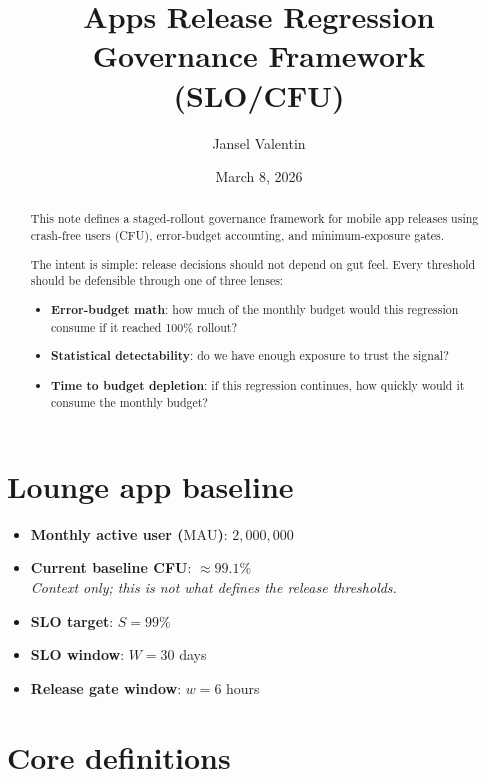 \documentclass{article}
\title{Apps Release Regression Governance Framework (SLO/CFU)}
\author{Jansel Valentin}
\date{March 8, 2026}
\newcommand{\MAU}{\mathrm{MAU}}
\begin{document}
\maketitle

\begin{abstract}
This note defines a staged-rollout governance framework for mobile app releases using 
crash-free users (CFU), error-budget accounting, and minimum-exposure gates.

The intent is simple: release decisions should not depend on gut feel.
Every threshold should be defensible through one of three lenses:

\begin{itemize}[leftmargin=1.4em]
    \item \textbf{Error-budget math}: how much of the monthly budget would this regression consume if it reached 100\% rollout?
    \item \textbf{Statistical detectability}: do we have enough exposure to trust the signal?
    \item \textbf{Time to budget depletion}: if this regression continues, how quickly would it consume the monthly budget?
\end{itemize}

\end{abstract}

\section*{Lounge app baseline}

\begin{itemize}[leftmargin=1.4em]
    \item \textbf{Monthly active user ($\MAU$)}: \(2{,}000{,}000\)
    \item \textbf{Current baseline CFU}: \(\approx 99.1\%\) \\
    \emph{Context only; this is not what defines the release thresholds.}
    \item \textbf{SLO target}: \(S = 99\%\)
    \item \textbf{SLO window}: \(W = 30\) days
    \item \textbf{Release gate window}: \(w = 6\) hours
\end{itemize}

\section{Core definitions}
\end{document}
